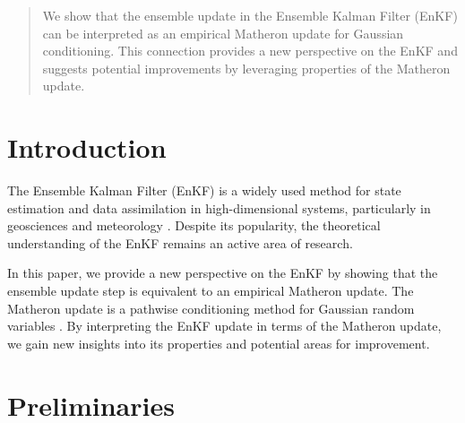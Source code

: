 \documentclass{article}
\theoremstyle{plain}
\begin{document}

\printAffiliationsAndNotice{}

\begin{abstract}
We show that the ensemble update in the Ensemble Kalman Filter (EnKF) can be interpreted as an empirical Matheron update for Gaussian conditioning. This connection provides a new perspective on the EnKF and suggests potential improvements by leveraging properties of the Matheron update.
\end{abstract}

\section{Introduction}

The Ensemble Kalman Filter (EnKF) is a widely used method for state estimation and data assimilation in high-dimensional systems, particularly in geosciences and meteorology \cite{EvensenData2009}. Despite its popularity, the theoretical understanding of the EnKF remains an active area of research.

In this paper, we provide a new perspective on the EnKF by showing that the ensemble update step is equivalent to an empirical Matheron update. The Matheron update is a pathwise conditioning method for Gaussian random variables \cite{Matheron1962,DoucetNote2010,WilsonPathwise2021}. By interpreting the EnKF update in terms of the Matheron update, we gain new insights into its properties and potential areas for improvement.

\section{Preliminaries}
\end{document}
